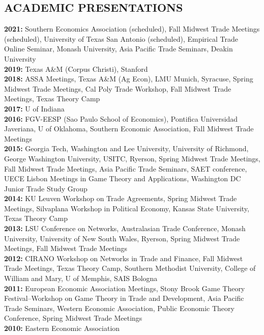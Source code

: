 \documentclass[11pt]{res}
\begin{document}
\begin{resume}
\section{ACADEMIC PRESENTATIONS}\vspace{1.5mm}
{\bf 2021:} Southern Economics Association (scheduled), Fall Midwest Trade Meetings (scheduled), University of Texas San Antonio (scheduled), Empirical Trade Online Seminar, Monash University, Asia Pacific Trade Seminars, Deakin University \vspace{1.5mm}\\
{\bf 2019:} Texas A\&M (Corpus Christi), Stanford \vspace{1.5mm}\\
{\bf 2018:} ASSA Meetings, Texas A\&M (Ag Econ), LMU Munich, Syracuse, Spring Midwest Trade Meetings, Cal Poly Trade Workshop, Fall Midwest Trade Meetings, Texas Theory Camp \vspace{1.5mm}\\
{\bf 2017:} U of Indiana \vspace{1.5mm}\\
{\bf 2016:} FGV-EESP (Sao Paulo School of Economics), Pontifica Universidad Javeriana, U of Oklahoma, Southern Economic Association, Fall Midwest Trade Meetings\vspace{1.5mm}\\
{\bf 2015:} Georgia Tech, Washington and Lee University, University of Richmond, George Washington University, USITC, Ryerson, Spring Midwest Trade Meetings, Fall Midwest Trade Meetings, Asia Pacific Trade Seminars, SAET conference, UECE Lisbon Meetings in Game Theory and Applications, Washington DC Junior Trade Study Group\vspace{1.5mm}\\
{\bf 2014:} KU Leuven Workshop on Trade Agreements, Spring Midwest Trade Meetings, Silvaplana Workshop in Political Economy, Kansas State University, Texas Theory Camp\vspace{1.5mm}\\
{\bf 2013:} LSU Conference on Networks, Australasian Trade Conference, Monash University, University of New South Wales, Ryerson, Spring Midwest Trade Meetings, Fall Midwest Trade Meetings \vspace{1.5mm}\\
{\bf 2012:}  CIRANO Workshop on Networks in Trade and Finance, Fall Midwest Trade Meetings, Texas Theory Camp, Southern Methodist University, College of William and Mary, U of Memphis, SAIS Bologna\vspace{1.5mm}\\
{\bf 2011:} European Economic Association Meetings, Stony Brook Game Theory Festival--Workshop on Game Theory in Trade and Development, Asia Pacific Trade Seminars, Western Economic Association, Public Economic Theory Conference, Spring Midwest Trade Meetings\vspace{1.5mm}\\
{\bf 2010:} Eastern Economic Association


\end{resume}
\end{document}
